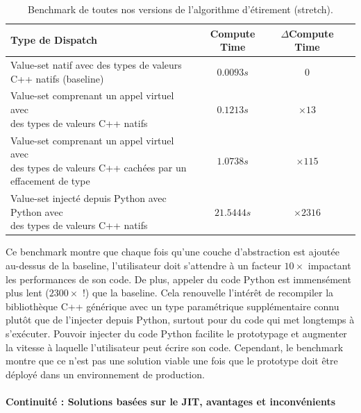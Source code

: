 \begin{table}[htbp]
  \footnotesize
  \centering
  \begin{tabular}{l|ccc}
    \toprule
    Type de Dispatch &
    Compute Time     &
    \(\Delta{}\)Compute Time
    \\ \midrule Value-set natif avec des types de valeurs C++ natifs (baseline)
                     & \(0.0093s\) & \(0\)                        \\
    \makecell[l]{Value-set comprenant un appel virtuel avec       \\ des types de valeurs C++ natifs}      &
    \(0.1213s\)      &
    \(\times 13\)
    \\
    \makecell[l]{Value-set comprenant un appel virtuel avec       \\ des types de valeurs C++ cachées par un effacement de type} &
    \(1.0738s\)      &
    \(\times 115\)
    \\
    \makecell[l]{Value-set injecté depuis Python avec Python avec \\ des types de valeurs C++ natifs} &
    \(21.5444s\)     &
    \(\times 2316\)
    \\
    \bottomrule
  \end{tabular}
  \caption[]{Benchmark de toutes nos versions de l'algorithme d'étirement (stretch).}
  \label{resume:table:static.dynamic.perfs}
\end{table}

Ce benchmark montre que chaque fois qu'une couche d'abstraction est ajoutée au-dessus de la baseline, l'utilisateur doit
s'attendre à un facteur \(10\times\) impactant les performances de son code. De plus, appeler du code Python est
immensément plus lent (\(2300\times\) !) que la baseline. Cela renouvelle l'intérêt de recompiler la bibliothèque C++
générique avec un type paramétrique supplémentaire connu plutôt que de l'injecter depuis Python, surtout pour du code
qui met longtemps à s'exécuter. Pouvoir injecter du code Python facilite le prototypage et augmenter la vitesse à
laquelle l'utilisateur peut écrire son code. Cependant, le benchmark montre que ce n'est pas une solution viable une
fois que le prototype doit être déployé dans un environnement de production.

\paragraph{Continuité : Solutions basées sur le JIT, avantages et inconvénients}

